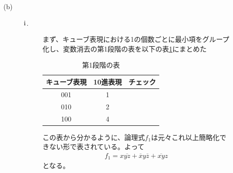 \documentclass{jsarticle}
\begin{document}
\begin{description}
\begin{description}
\begin{description}
          \end{description}
          \item [(b)]
          \begin{description}
              \item [$\rm \hspace{.08em}i\hspace{.08em}$.]
              まず、キューブ表現における1の個数ごとに最小項をグループ化し、変数消去の第1段階の表を以下の表\ref{tab:b1}にまとめた
              \begin{table}[H]
                  \caption{第1段階の表}
                  \label{tab:b1}
                  \centering
                  \begin{tabular}{|c|c|c|} \hline
                      キューブ表現 & 10進表現 & チェック  \\ \hline
                      001 & 1 & \\
                      010 & 2 & \\
                      100 & 4 & \\ \hline
                  \end{tabular}
              \end{table}
              この表から分かるように、論理式$f_1$は元々これ以上簡略化できない形で表されている。よって
              \begin{align}
                  f_1 = x\overline{yz} + \overline{x}y\overline{z} + \overline{xy}z
              \end{align}
              となる。


\end{description}
\end{description}
\end{description}
\end{document}
